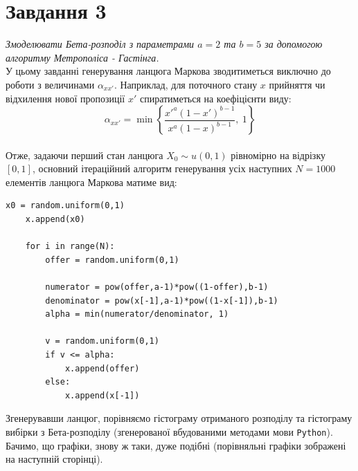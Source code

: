 \documentclass[a4paper,14pt]{extarticle} %
\numberwithin{equation}{section}
\begin{document}
\newpage
\section*{Завдання 3}

\textit{Змоделювати Бета-розподіл з параметрами $a=2$ та $b=5$ за допомогою алгоритму Метрополіса - Гастінга.} \\

У цьому завданні генерування ланцюга Маркова зводитиметься виключно до роботи з величинами $\alpha_{xx'}$. Наприклад, для поточного стану $x$ прийняття чи відхилення нової пропозиції $x'$ спиратиметься на коефіцієнти виду: \\

\[ \alpha_{xx'}=\min\left\{\frac{{x'}^a(1-{x'})^{b-1}}{x^a(1-x)^{b-1}},\ 1\right\} \] \\

Отже, задаючи перший стан ланцюга $X_0\sim u(0,1)$ рівномірно на відрізку $[0,1]$, основний ітераційний алгоритм генерування усіх наступних $N=1000$ елементів ланцюга Маркова матиме вид: \\

\begin{lstlisting}[firstnumber=1, label = code: task 3, caption = Генерування ланцюга Маркова]
    x0 = random.uniform(0,1)
    x.append(x0)
    
    for i in range(N):
        offer = random.uniform(0,1)
    
        numerator = pow(offer,a-1)*pow((1-offer),b-1)
        denominator = pow(x[-1],a-1)*pow((1-x[-1]),b-1)
        alpha = min(numerator/denominator, 1)
    
        v = random.uniform(0,1)
        if v <= alpha:
            x.append(offer)
        else:
            x.append(x[-1])
\end{lstlisting}

\vspace{0.4cm}
Згенерувавши ланцюг, порівняємо гістограму отриманого розподілу та гістограму вибірки з Бета-розподілу (згенерованої вбудованими методами мови \texttt{Python}). Бачимо, що графіки, знову ж таки, дуже подібні (порівняльні графіки зображені на наступній сторінці).
\end{document}
